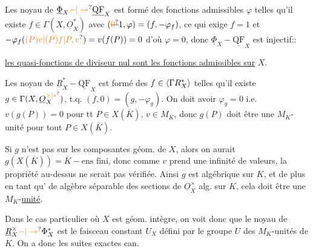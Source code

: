 Les  noyau de $\underline{\Phi}_X\unsure{-|\to}\underline{\mathrm{QF}}_X$ est formé des fonctions admissibles $\varphi$ telles qu'il existe $f\in\Gamma(X,\underline O_X^*)$ avec $(\deleted{\unsure{0}}1,\varphi)=(f,-\varphi_f)$, ce qui exige $f=1$ et $-\varphi_f(\unsure{(P)v|(P)f|P,v})=v(f(P))=0$ d'où $\varphi=0$, donc $\underline{\Phi}_X-\underline{\mathrm{QF}}_X$ est injectif::

\uline{les quasi-fonctions de diviseur nul sont les fonctions admissibles sur} $X$.

Les  noyau de $\underline R_X^*-\underline{\mathrm{QF}}_X$ est formé des $f\in{\inserted{\Gamma R_X^*}}$ telles qu'il existe $g\in\Gamma(X,\underline O_X^{\unsure{\times|*}})$, t.q. $(f,0)=(g,-\varphi_g)$. On doit avoir
$\varphi_g=0$ i.e. $v(g(P))=0$ pour tt $P\in X(\overline K)$, $v\in M_{\overline K}$, donc $g(P)$ doit être une $M_{\overline K}$-unité pour tout $P\in X(\overline K)$.

Si $g$ n'est pas  sur les composantes   géom. de $X$, alors  on aurait $g(X(\overline K))=\overline K-\text{ens fini}$, donc  comme $v$  prend une infinité de valeurs, la propriété au-dessus ne serait pas vérifiée. Ainsi $g$ est algébrique sur $K$, et de plus en tant qu' de algèbre séparable des sections  de $\underline O_X^{\times}$ alg. sur $K$, cela doit être une $M_K$-\uline{unité}.

Dans le cas particulier où $X$ est géom. intègre, on voit donc que le noyau de $\underline R_X^{\times}\unsure{-|\to}\Phi_X^*$ est le faisceau  constant $U_X$ défini par le groupe $U$ des $M_K$-unités de $K$. On a donc les suites exactes can.

